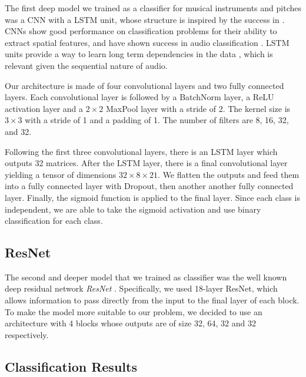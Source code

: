 \documentclass[runningheads,a4paper]{llncs}
\begin{document}
The first deep model we trained as a classifier for musical instruments and pitches was a CNN with a LSTM unit, whose structure is inspired by the success in \cite{Salamon17}. CNNs show good performance on classification problems for their ability to extract spatial features, and have shown success in audio classification \cite{Hershey17}. LSTM units provide a way to learn long term dependencies in the data \cite{Hochreiter97}, which is relevant given the sequential nature of audio.

Our architecture is made of four convolutional layers and two fully connected layers. Each convolutional layer is followed by a BatchNorm layer, a ReLU activation layer and a $2 \times 2$  MaxPool layer with a stride of 2. The kernel size is $3 \times 3$ with a stride of 1 and a padding of 1. The number of filters are 8, 16, 32, and 32.

Following the first three convolutional layers, there is an LSTM layer which outputs 32 matrices. After the LSTM layer, there is a final convolutional layer yielding a tensor of dimensions $32\times 8 \times 21$. We flatten the outputs and feed them into a fully connected layer with Dropout, then another another fully connected layer. Finally, the sigmoid function is applied to the final layer. Since each class is independent, we are able to take the sigmoid activation and use binary classification for each class. %

\subsection{ResNet}

The second and deeper model that we trained as classifier was the well known deep residual network \emph{ResNet} \cite{He15}. Specifically, we used 18-layer ResNet, which allows information to pass directly from the input to the final layer of each block. To make the model more suitable to our problem, we decided to use an architecture with 4 blocks whose outputs are of size 32, 64, 32 and 32 respectively.

\subsection{Classification Results}
\end{document}
